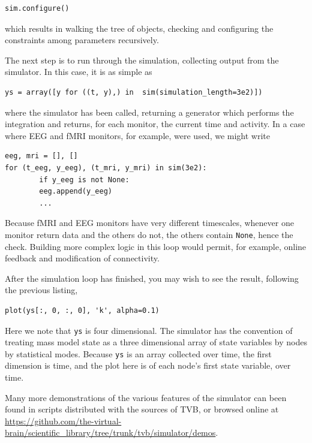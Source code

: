 \documentclass{bioinfo}
\begin{document}
\begin{lstlisting}
sim.configure()
\end{lstlisting}

\noindent which results in walking the tree of objects, checking and 
configuring the constraints among parameters recursively.

The next step is to run through the simulation, collecting
output from the simulator. In this case, it is as simple as

\begin{lstlisting}
ys = array([y for ((t, y),) in  sim(simulation_length=3e2)])
\end{lstlisting}

\noindent where the simulator has been called, returning a 
generator which performs the integration and returns, for each
monitor, the current time and activity. In a case where EEG 
and fMRI monitors, for example, were used, we might write

\begin{lstlisting}
eeg, mri = [], []
for (t_eeg, y_eeg), (t_mri, y_mri) in sim(3e2):
		if y_eeg is not None:
		eeg.append(y_eeg)
		...
\end{lstlisting}

\noindent Because fMRI and EEG monitors have very different
timescales, whenever one monitor return data and the others do
not, the others contain \texttt{None}, hence the check. Building
more complex logic in this loop would permit, for example, online
feedback and modification of connectivity. 

After the simulation loop has finished, you may wish to see the
result, following the previous listing, 

\begin{lstlisting}
plot(ys[:, 0, :, 0], 'k', alpha=0.1)
\end{lstlisting}

\noindent Here we note that \texttt{ys} is four dimensional. The 
simulator has the convention of treating  mass model state as a
three dimensional array of state variables by nodes by statistical
modes. Because \texttt{ys} is an array collected over time, the first
dimension is time, and the plot here is of each node's first state
variable, over time.

Many more demonstrations of the various features of the simulator
can been found in scripts distributed with the sources of TVB, or 
browsed online at \url{https://github.com/the-virtual-brain/scientific_library/tree/trunk/tvb/simulator/demos}.
\end{document}
